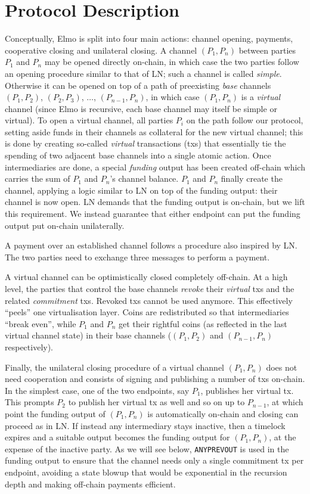 \section{Protocol Description}
  Conceptually, Elmo is split into four main actions: channel opening,
  payments, cooperative closing and unilateral closing. A channel $(P_1, P_n)$
  between parties $P_1$ and $P_n$
  may be opened directly on-chain, in which case the two parties follow an
  opening procedure similar to that of LN; such a channel is called
  \emph{simple}.
  Otherwise it can be opened on top of a path
  of preexisting \emph{base} channels $(P_1, P_2)$, $(P_2, P_3)$, $\dots$,
  $(P_{n-1}, P_{n})$, in which case $(P_1, P_n)$ is a \emph{virtual}
  channel (since Elmo is recursive, each base channel may itself be simple or
  virtual). To open a virtual
  channel, all parties $P_i$ on the
  path follow our protocol, setting aside funds in their channels as
  collateral for the new virtual channel; this is done
  by creating so-called \emph{virtual} transactions (txs) that essentially
  tie the spending of two adjacent base channels into a single atomic action.
  Once intermediaries are done, a special \emph{funding} output has been
  created off-chain which carries the sum of $P_1$ and $P_n$'s channel
  balance. $P_1$ and $P_n$
  finally create the channel, applying a logic similar to LN on top of
  the funding output: their channel is now open. LN demands that the funding
  output is on-chain, but we lift this requirement. We instead guarantee that
  either endpoint can put the funding output put on-chain unilaterally.

  A payment over an established channel follows a procedure also inspired by
  LN.
  The two parties need to exchange three messages to perform a payment.

  A virtual channel can be optimistically closed completely off-chain. At a high
  level, the parties that control the base channels \emph{revoke} their \emph{virtual}
  txs and the related \emph{commitment} txs. Revoked txs
  cannot be used anymore. This effectively ``peels'' one virtualisation layer.
  Coins are redistributed so that intermediaries ``break even'', while $P_1$
  and $P_n$ get their rightful coins (as reflected in the last virtual channel
  state) in their base channels ($(P_1, P_2)$ and $(P_{n-1}, P_n)$
  respectively).

  Finally, the unilateral closing procedure of a virtual channel $(P_1, P_n)$
  does not need cooperation and consists of signing and publishing a number of
  txs on-chain. In the simplest case, one of the two endpoints, say
  $P_1$, publishes her virtual tx. This prompts $P_2$ to publish her
  virtual tx as well and so on up to $P_{n-1}$, at which point the
  funding output of $(P_1, P_n)$ is automatically on-chain and closing can
  proceed as in LN. If instead any intermediary stays inactive, then a timelock
  expires and a suitable output becomes the funding output for $(P_1, P_n)$, at
  the expense of the inactive party. As we will see below, \texttt{ANYPREVOUT} is
  used in the funding output to ensure that the channel needs only a
  single commitment tx per endpoint, avoiding a state blowup that would be
  exponential in the recursion depth and making off-chain payments efficient.

